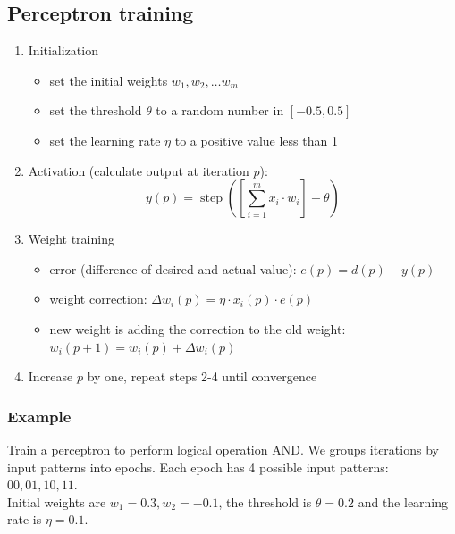 \documentclass[a4paper,12pt,answers]{article}
\DeclareMathOperator*{\step}{step}
\newcommand{\stepfn}[1]{\step\left( #1 \right) }
\begin{document}
	
	\subsection{Perceptron training}
	\begin{enumerate}
		\item Initialization
		\begin{itemize}
			\item set the initial weights $w_1, w_2, \dots w_m$
			\item set the threshold $\theta$ to a random number in $\left[ -0.5, 0.5 \right] $
			\item set the learning rate $\eta$ to a positive value less than 1
		\end{itemize}
		\item Activation (calculate output at iteration $p$):
		\[
		y(p) = \stepfn{\left[ \sum_{i=1}^{m}{x_i \cdot w_i} \right] - \theta}
		\]
		\item Weight training
		\begin{itemize}
			\item error (difference of desired and actual value): $e(p) = d(p) - y(p) $
			\item weight correction: $\Delta w_i(p) = \eta \cdot x_i(p) \cdot e(p) $
			\item new weight is adding the correction to the old weight: $w_i(p+1) = w_i(p) + \Delta w_i(p)$
		\end{itemize}
		\item Increase $p$ by one, repeat steps 2-4 until convergence
	\end{enumerate}
	
	\subsubsection{Example}
	Train a perceptron to perform logical operation AND. We groups iterations by input patterns into epochs. Each epoch has 4 possible input patterns: $00, 01, 10, 11$.
	\\[4pt]
	\noindent
	Initial weights are $w_1 = 0.3, w_2 = -0.1$, the threshold is $\theta=0.2$ and the learning rate is $\eta=0.1$.
\end{document}
